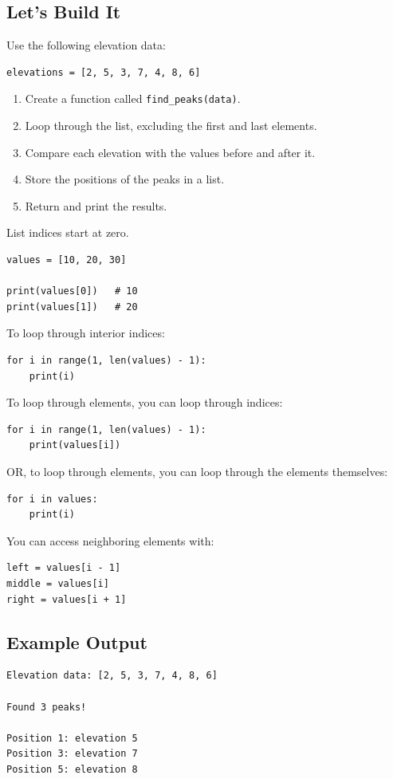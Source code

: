 \documentclass[11pt,letterpaper]{article}
\newcommand{\steps}{\subsection*{Let's Build It}}
\newcommand{\exampleoutput}{\subsection*{Example Output}}
\begin{document}
\steps

Use the following elevation data:

\begin{lstlisting}
elevations = [2, 5, 3, 7, 4, 8, 6]
\end{lstlisting}

\begin{enumerate}
    \item Create a function called
    \texttt{find\_peaks(data)}.
    \item Loop through the list, excluding the first and last elements.
    \item Compare each elevation with the values before and after it.
    \item Store the positions of the peaks in a list.
    \item Return and print the results.
\end{enumerate}

\begin{hintbox}
List indices start at zero.

\begin{lstlisting}
values = [10, 20, 30]

print(values[0])   # 10
print(values[1])   # 20
\end{lstlisting}

To loop through interior indices:
\begin{lstlisting}
for i in range(1, len(values) - 1):
    print(i)
\end{lstlisting}

To loop through elements, you can loop through indices:
\begin{lstlisting}
for i in range(1, len(values) - 1):
    print(values[i])
\end{lstlisting}

OR, to loop through elements, you can loop through the elements themselves:
\begin{lstlisting}
for i in values:
    print(i)
\end{lstlisting}

You can access neighboring elements with:
\begin{lstlisting}
left = values[i - 1]
middle = values[i]
right = values[i + 1]
\end{lstlisting}
\end{hintbox}

\exampleoutput

\begin{lstlisting}[style=outputstyle]
Elevation data: [2, 5, 3, 7, 4, 8, 6]

Found 3 peaks!

Position 1: elevation 5
Position 3: elevation 7
Position 5: elevation 8
\end{lstlisting}
\end{document}
